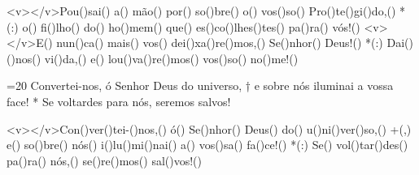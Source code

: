 <v></v>Pou()sai() a() mão() por() so()bre() o() vos()so() Pro()te()gi()do,() *(:)
o() fi()lho() do() ho()mem() que() es()co()lhes()tes() pa()ra() vós!()
<v></v>E() nun()ca() mais() vos() dei()xa()re()mos,() Se()nhor() Deus!() *(:)
Dai()()nos() vi()da,() e() lou()va()re()mos() vos()so() no()me!()

=20 Convertei-nos, ó Senhor Deus do universo, †
e sobre nós iluminai a vossa face! *
Se voltardes para nós, seremos salvos!

<v></v>Con()ver()tei-()nos,() ó() Se()nhor() Deus() do() u()ni()ver()so,() +(,)
e() so()bre() nós() i()lu()mi()nai() a() vos()sa() fa()ce!() *(:)
Se() vol()tar()des() pa()ra() nós,() se()re()mos() sal()vos!()